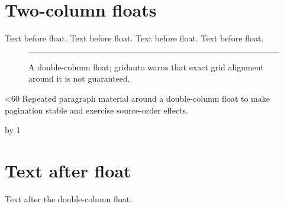 \documentclass[twocolumn]{article}
\begin{document}
\section{Two-column floats}
Text before float. Text before float. Text before float. Text before float.
\begin{figure}[t]
\centering\rule{.7\textwidth}{2cm}
\caption{A double-column float; gridauto warns that exact grid alignment around it is not guaranteed.}
\end{figure}
\newcount\n {}
\loop\ifnum\n<60
Repeated paragraph material around a double-column float to make pagination stable and exercise source-order effects.\par
\advance\n by 1
\repeat
\section{Text after float}
Text after the double-column float.
\end{document}
